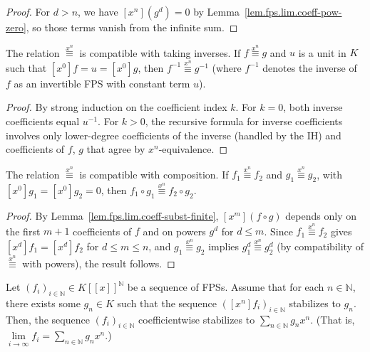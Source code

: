 \begin{proof}
\leanok
For $d > n$, we have $[x^n](g^d) = 0$ by Lemma~\ref{lem.fps.lim.coeff-pow-zero},
so those terms vanish from the infinite sum.
\end{proof}

\begin{lemma}
\label{lem.fps.lim.xnEquiv-invOfUnit}
\leanhelper
\leanok
The relation $\overset{x^n}{\equiv}$ is compatible with taking inverses. If $f \overset{x^n}{\equiv} g$
and $u$ is a unit in $K$ such that $[x^0]f = u = [x^0]g$, then $f^{-1} \overset{x^n}{\equiv} g^{-1}$
(where $f^{-1}$ denotes the inverse of $f$ as an invertible FPS with constant term $u$).
\end{lemma}

\begin{proof}
\leanok
By strong induction on the coefficient index $k$.
For $k = 0$, both inverse coefficients equal $u^{-1}$.
For $k > 0$, the recursive formula for inverse coefficients involves only
lower-degree coefficients of the inverse (handled by the IH) and
coefficients of $f$, $g$ that agree by $x^n$-equivalence.
\end{proof}

\begin{lemma}
\label{lem.fps.lim.xnEquiv-subst}
\leanhelper
\leanok
The relation $\overset{x^n}{\equiv}$ is compatible with composition. If
$f_1 \overset{x^n}{\equiv} f_2$ and $g_1 \overset{x^n}{\equiv} g_2$,
with $[x^0]g_1 = [x^0]g_2 = 0$, then
$f_1 \circ g_1 \overset{x^n}{\equiv} f_2 \circ g_2$.
\end{lemma}

\begin{proof}
\leanok
By Lemma~\ref{lem.fps.lim.coeff-subst-finite}, $[x^m](f \circ g)$ depends only on
the first $m+1$ coefficients of $f$ and on powers $g^d$ for $d \leq m$.
Since $f_1 \overset{x^n}{\equiv} f_2$ gives $[x^d]f_1 = [x^d]f_2$ for $d \leq m \leq n$,
and $g_1 \overset{x^n}{\equiv} g_2$ implies $g_1^d \overset{x^n}{\equiv} g_2^d$
(by compatibility of $\overset{x^n}{\equiv}$ with powers), the result follows.
\end{proof}

\begin{theorem}
\label{thm.fps.lim.lim-crit}
\leantarget
\leanok
Let $\left(  f_{i}\right)  _{i\in\mathbb{N}}\in
K\left[  \left[  x\right]  \right]  ^{\mathbb{N}}$ be a sequence of FPSs.
Assume that for each $n\in\mathbb{N}$, there exists some $g_{n}\in K$ such
that the sequence $\left(  \left[  x^{n}\right]  f_{i}\right)  _{i\in
\mathbb{N}}$ stabilizes to $g_{n}$. Then, the sequence $\left(  f_{i}\right)
_{i\in\mathbb{N}}$ coefficientwise stabilizes to $\sum_{n\in\mathbb{N}}%
g_{n}x^{n}$. (That is, $\lim\limits_{i\rightarrow\infty}f_{i}=\sum
_{n\in\mathbb{N}}g_{n}x^{n}$.)
\end{theorem}

